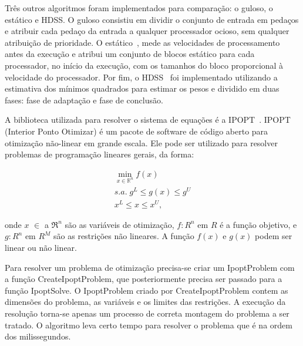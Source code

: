 Três outros algoritmos foram implementados para comparação: o guloso, o estático e 
HDSS. O guloso consistiu em dividir o conjunto de entrada em pedaços e atribuir 
cada pedaço da entrada a qualquer processador ocioso, sem qualquer atribuição de prioridade. O estático~\cite{raphael}, mede as velocidades de processamento antes da execução e  atribui um conjunto  de blocos estático para cada processador, no início da execução, com os
tamanhos do bloco proporcional à velocidade do processador. Por fim, o HDSS~\cite{hdss}  
foi implementado utilizando a estimativa dos mínimos quadrados para estimar os pesos e 
dividido em duas fases: fase de adaptação e fase de conclusão. 

A biblioteca utilizada para resolver o sistema de equações é a IPOPT~\cite{point}. IPOPT (Interior Ponto Otimizar) é um pacote de software de código aberto para otimização não-linear em grande escala. Ele pode ser utilizado para resolver problemas de programação lineares gerais, da forma:

\begin{eqnarray}
\displaystyle \min_{x\in\mathbb{R}^n} 
	\displaystyle f(x) \\
	s.a.\displaystyle \;  \nonumber 
	 	\displaystyle g^L \leq g(x) \leq g^U  \nonumber \\	
 	 	\displaystyle x^L \leq x \leq x^U, \nonumber 
\end{eqnarray}

onde $x$ $\in$ a $\Re ^ n$ são as variáveis de otimização, $f : R^n$ em $R$ é a função objetivo, e $g: R^n$ em $R^M$ são as restrições não lineares. A função $f(x)$ e $g(x)$ podem ser linear ou não linear.  

Para resolver um problema de otimização precisa-se criar um IpoptProblem com a função CreateIpoptProblem, que posteriormente precisa ser passado para a função IpoptSolve. O IpoptProblem criado por CreateIpoptProblem contem as dimensões do problema, as variáveis e os limites das restrições. A execução da resolução torna-se apenas um processo de correta montagem do problema a ser tratado. O algoritmo leva certo tempo para resolver o problema que é na ordem dos milissegundos. 


